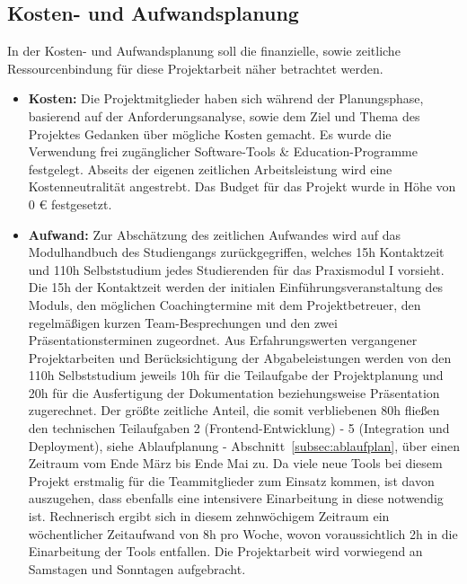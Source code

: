 \subsection{Kosten- und Aufwandsplanung}\label{subsec:Kosten-Aufwandsplanung}
In der Kosten- und Aufwandsplanung soll die finanzielle, sowie zeitliche Ressourcenbindung für diese Projektarbeit näher betrachtet werden.
\begin{itemize}[itemsep=1em, leftmargin=*]
    \item\textbf{Kosten:} Die Projektmitglieder haben sich während der Planungsphase, basierend auf der Anforderungsanalyse, sowie dem Ziel und Thema des Projektes Gedanken über mögliche Kosten gemacht.
    Es wurde die Verwendung frei zugänglicher Software-Tools \& Education-Programme festgelegt.
    Abseits der eigenen zeitlichen Arbeitsleistung wird eine Kostenneutralität angestrebt.
    Das Budget für das Projekt wurde in Höhe von 0 € festgesetzt.

    \item\textbf{Aufwand:} Zur Abschätzung des zeitlichen Aufwandes wird auf das Modulhandbuch des Studiengangs zurückgegriffen, welches 15h Kontaktzeit und 110h Selbststudium jedes Studierenden für das Praxismodul I vorsieht.
    Die 15h der Kontaktzeit werden der initialen Einführungsveranstaltung des Moduls, den möglichen Coachingtermine mit dem Projektbetreuer, den regelmäßigen kurzen Team-Besprechungen und den zwei Präsentationsterminen zugeordnet.
    Aus Erfahrungswerten vergangener Projektarbeiten und Berücksichtigung der Abgabeleistungen werden von den 110h Selbststudium jeweils 10h für die Teilaufgabe der Projektplanung und 20h für die Ausfertigung der Dokumentation beziehungsweise Präsentation zugerechnet.
    Der größte zeitliche Anteil, die somit verbliebenen 80h fließen den technischen Teilaufgaben 2 (Frontend-Entwicklung) - 5 (Integration und Deployment), siehe Ablaufplanung - Abschnitt~\ref{subsec:ablaufplan}, über einen Zeitraum vom Ende März bis Ende Mai zu.
    Da viele neue Tools bei diesem Projekt erstmalig für die Teammitglieder zum Einsatz kommen, ist davon auszugehen, dass ebenfalls eine intensivere Einarbeitung in diese notwendig ist.
    Rechnerisch ergibt sich in diesem zehnwöchigem Zeitraum ein wöchentlicher Zeitaufwand von 8h pro Woche, wovon voraussichtlich 2h in die Einarbeitung der Tools entfallen.
    Die Projektarbeit wird vorwiegend an Samstagen und Sonntagen aufgebracht.
\end{itemize}

